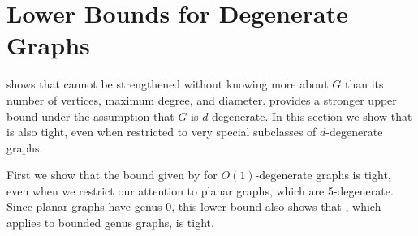 \documentclass{patmorin}
\newcommand{\abas}[1]{\textcolor{orange}{\big[Abbas: #1\big]}}
\begin{document}
%
%
%
%
%
%

\section{Lower Bounds for Degenerate Graphs}

 shows that 
cannot be strengthened without knowing more about $G$ than its number of vertices, maximum
degree, and diameter.   provides a stronger
upper bound under the assumption that $G$ is $d$-degenerate.  
In this section we
show that  is also tight, even
when restricted to  very special subclasses of $d$-degenerate graphs.

First we show that the bound given by
 for $O(1)$-degenerate graphs
is tight, even when we restrict our attention to planar graphs, which
are 5-degenerate.  Since planar graphs have genus 0, this lower bound
also shows that , which applies to
bounded genus graphs, is  tight.
\end{document}

